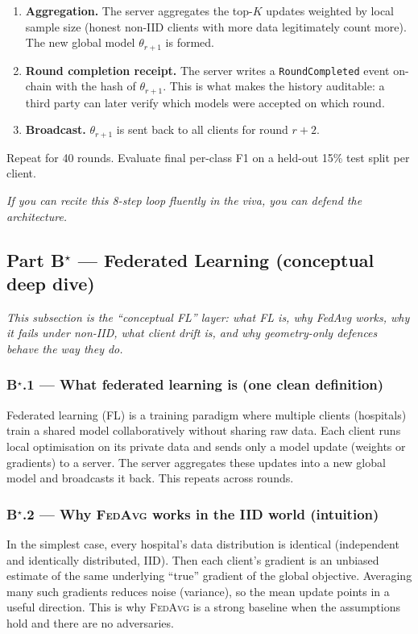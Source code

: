 \documentclass[11pt,a4paper]{article}
\newcommand{\fedavg}{\textsc{FedAvg}\xspace}
\begin{document}
\begin{enumerate}
\item \textbf{Aggregation.}
The server aggregates the top-$K$ updates weighted by local sample size (honest non-IID clients with more data legitimately count more). The new global model $\theta_{r+1}$ is formed.

\item \textbf{Round completion receipt.}
The server writes a \texttt{RoundCompleted} event on-chain with the hash of $\theta_{r+1}$. This is what makes the history auditable: a third party can later verify which models were accepted on which round.

\item \textbf{Broadcast.}
$\theta_{r+1}$ is sent back to all clients for round $r+2$.
\end{enumerate}

Repeat for 40 rounds. Evaluate final per-class F1 on a held-out 15\% test split per client.

\textit{If you can recite this 8-step loop fluently in the viva, you can defend the architecture.}

\subsection{Part B$^\star$ --- Federated Learning (conceptual deep dive)}
\label{sec:fl-conceptual}

\textit{This subsection is the ``conceptual FL'' layer: what FL is, why FedAvg works,
why it fails under non-IID, what client drift is, and why geometry-only defences behave the way they do.}

\subsubsection{B$^\star$.1 --- What federated learning is (one clean definition)}
Federated learning (FL) is a training paradigm where multiple clients (hospitals)
train a shared model collaboratively without sharing raw data. Each client runs
local optimisation on its private data and sends only a model update (weights or
gradients) to a server. The server aggregates these updates into a new global
model and broadcasts it back. This repeats across rounds.

\subsubsection{B$^\star$.2 --- Why \fedavg works in the IID world (intuition)}
In the simplest case, every hospital's data distribution is identical
(independent and identically distributed, IID). Then each client's gradient is
an unbiased estimate of the same underlying ``true'' gradient of the global
objective. Averaging many such gradients reduces noise (variance), so the mean
update points in a useful direction. This is why \fedavg is a strong baseline
when the assumptions hold and there are no adversaries.
\end{document}
